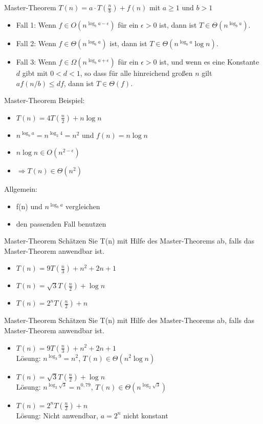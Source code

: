 \begin{frame}{Master-Theorem}
$T(n)=a\cdot T(\frac{n}{b})+f(n)$ mit
$a\geq 1$ und $b >1$\\
\begin{itemize}
\item Fall 1: Wenn $f \in O(n^{\log_b a -\epsilon})$ für ein
  $\epsilon>0$ ist, dann ist $T\in \Theta (n^{\log_b a})$.
\item Fall 2: Wenn $f \in \Theta (n^{\log_b a})$ ist, dann ist
  $T\in \Theta (n^{\log_b a}\log n)$.
\item Fall 3: Wenn $f \in \Omega(n^{\log_b a +\epsilon})$ für ein
  $\epsilon>0$ ist, und wenn es eine Konstante $d$ gibt mit $0<d<1$, so
  dass für alle hinreichend großen $n$ gilt $af(n/b)\leq d f$, dann
  ist $T\in \Theta (f)$.
\end{itemize}
\end{frame}

\begin{frame}{Master-Theorem}
Beispiel:
\begin{itemize}
\item $T(n)=4T(\frac{n}{2})+n\log n$
\item $n^{\log_b a} = n^{\log_2 4}=n^2$ und $f(n)=n\log n$
\item $n\log n \in O(n^{2-\epsilon})$
\item $\Rightarrow T(n) \in \Theta (n^2)$
\end{itemize}
Allgemein:
\begin{itemize}
\item f(n) und $n^{\log_b a}$ vergleichen
\item den passenden Fall benutzen
\end{itemize}
\end{frame}

\begin{frame}{Master-Theorem}
Schätzen Sie T(n) mit Hilfe des Master-Theorems ab, falls das Master-Theorem anwendbar ist. 
\begin{itemize}
\item $T(n)=9T(\frac{n}{3})+n^2+2n+1$
\item $T(n)=\sqrt{3}T(\frac{n}{2})+\log n$
\item $T(n)=2^nT(\frac{n}{2})+n$
\end{itemize}
\end{frame}

\begin{frame}{Master-Theorem}
Schätzen Sie T(n) mit Hilfe des Master-Theorems ab, falls das Master-Theorem anwendbar ist. 
\begin{itemize}
\item $T(n)=9T(\frac{n}{3})+n^2+2n+1$\\
Lösung: $n^{\log_3 9} = n^2 $, $T(n) \in \Theta (n^2\log n)$
\pause
\item $T(n)=\sqrt{3}T(\frac{n}{2})+\log n$\\
Lösung: $n^{\log_2 \sqrt{3}} = n^{0,79} $, $T(n) \in \Theta (n^{\log_2 \sqrt{3}})$
\pause
\item $T(n)=2^nT(\frac{n}{2})+n$\\
Lösung: Nicht anwendbar, $a=2^n$ nicht konstant
\end{itemize}
\end{frame}

